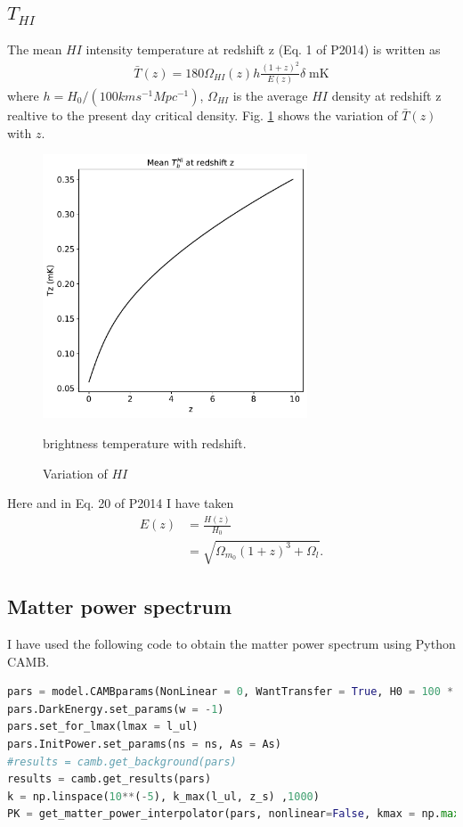 \documentclass[12pt]{article}
\numberwithin{equation}{section}
\begin{document}
\subsection{$ T_{HI} $}
The mean $ HI $ intensity temperature at redshift z (Eq. 1 of P2014) is written as
\begin{align}
\bar{T}(z) = 180 \Omega_{HI}(z) h \frac{(1 + z)^2}{E(z)}\delta \; \mathrm{mK}
\end{align}
where $ h = H_0 / (100 kms^{-1}Mpc^{-1})$, $ \Omega_{HI} $ is the average $ HI $ density at redshift z realtive to the present day critical density. Fig. \ref{fig:tz-vs-z} shows the variation of $ \bar{T}(z) $ with $ z $.
\begin{figure}
	\centering
	\includegraphics[width=0.7\textwidth]{variation-of-tz-with-z}
	\caption{Variation of $ HI $} brightness temperature with redshift. 
	\label{fig:tz-vs-z}
\end{figure}
Here and in Eq. 20 of P2014 I have taken
\begin{align}
E(z) &= \frac{H(z)}{H_0}\\
&= \sqrt{\Omega_{m_0} (1 + z)^3 + \Omega_{l}}.
\end{align}

\subsection{Matter power spectrum}
I have used the following code to obtain the matter power spectrum using Python CAMB.
\begin{lstlisting}[language=python]
pars = model.CAMBparams(NonLinear = 0, WantTransfer = True, H0 = 100 * h, omch2 = omegach2, ombh2 = omegabh2, YHe = YHe)
pars.DarkEnergy.set_params(w = -1)
pars.set_for_lmax(lmax = l_ul)
pars.InitPower.set_params(ns = ns, As = As)
#results = camb.get_background(pars)
results = camb.get_results(pars)
k = np.linspace(10**(-5), k_max(l_ul, z_s) ,1000)
PK = get_matter_power_interpolator(pars, nonlinear=False, kmax = np.max(k), k_hunit = False, hubble_units = False)
\end{lstlisting}
\end{document}
